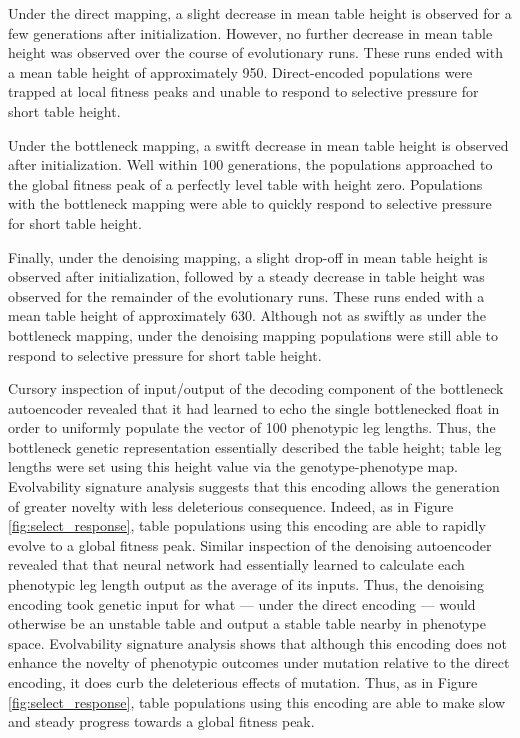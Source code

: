 Under the direct mapping, a slight decrease in mean table height is observed for a few generations after initialization.
However, no further decrease in mean table height was observed over the course of evolutionary runs.
These runs ended with a mean table height of approximately 950.
Direct-encoded populations were trapped at local fitness peaks and unable to respond to selective pressure for short table height.

Under the bottleneck mapping, a switft decrease in mean table height is observed after initialization.
Well within 100 generations, the populations approached to the global fitness peak of a perfectly level table with height zero.
Populations with the bottleneck mapping were able to quickly respond to selective pressure for short table height.

Finally, under the denoising mapping, a slight drop-off in mean table height is observed after initialization, followed by a steady decrease in table height was observed for the remainder of the evolutionary runs.
These runs ended with a mean table height of approximately 630.
Although not as swiftly as under the bottleneck mapping, under the denoising mapping populations were still able to respond to selective pressure for short table height.

Cursory inspection of input/output of the decoding component of the bottleneck autoencoder revealed that it had learned to echo the single bottlenecked float in order to uniformly populate the vector of 100 phenotypic leg lengths.
Thus, the bottleneck genetic representation essentially described the table height; table leg lengths were set using this height value via the genotype-phenotype map.
Evolvability signature analysis suggests that this encoding allows the generation of greater novelty with less deleterious consequence.
Indeed, as in Figure \ref{fig:select_response}, table populations using this encoding are able to rapidly evolve to a global fitness peak.
Similar inspection of the denoising autoencoder revealed that that neural network had essentially learned to calculate each phenotypic leg length output as the average of its inputs.
Thus, the denoising encoding took genetic input for what --- under the direct encoding --- would otherwise be an unstable table and output a stable table nearby in phenotype space.
Evolvability signature analysis shows that although this encoding does not enhance the novelty of phenotypic outcomes under mutation relative to the direct encoding, it does curb the deleterious effects of mutation.
Thus, as in Figure \ref{fig:select_response}, table populations using this encoding are able to make slow and steady progress towards a global fitness peak.

